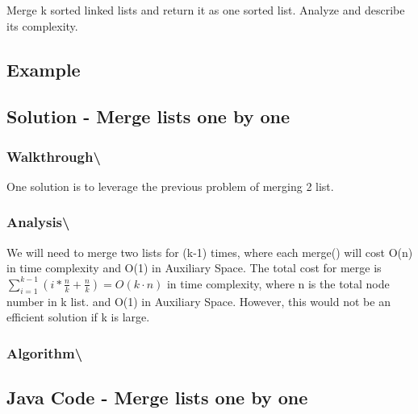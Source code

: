 \documentclass[]{book}
\begin{document}
Merge k sorted linked lists and return it as one sorted list. Analyze and describe its complexity.

\hypertarget{example-90}{%
\subsection{Example}\label{example-90}}

\hypertarget{solution---merge-lists-one-by-one}{%
\subsection{Solution - Merge lists one by one}\label{solution---merge-lists-one-by-one}}

\hypertarget{walkthrough-109}{%
\subsubsection{Walkthrough\textbackslash{}}\label{walkthrough-109}}

One solution is to leverage the previous problem of merging 2 list.

\hypertarget{analysis-116}{%
\subsubsection{Analysis\textbackslash{}}\label{analysis-116}}

We will need to merge two lists for (k-1) times, where each
merge() will cost O(n) in time complexity and O(1) in Auxiliary Space. The total cost for merge is
\(\sum_{i=1}^{k-1} (i * \frac{n}{k} + \frac{n}{k}) = O(k \cdot n)\) in time complexity, where n is the
total node number in k list. and O(1) in Auxiliary Space. However, this would not be an efficient solution if k
is large.

\hypertarget{algorithm-122}{%
\subsubsection{Algorithm\textbackslash{}}\label{algorithm-122}}

\hypertarget{java-code---merge-lists-one-by-one}{%
\subsection{Java Code - Merge lists one by one}\label{java-code---merge-lists-one-by-one}}
\end{document}
